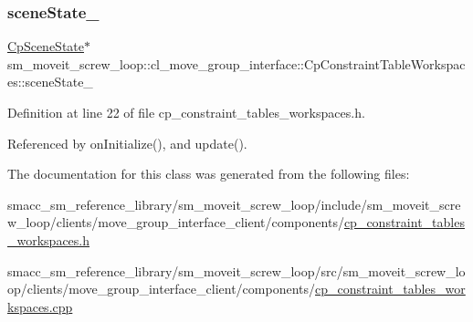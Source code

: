 \subsubsection{\texorpdfstring{scene\+State\+\_\+}{sceneState\_}}
{\footnotesize\ttfamily \hyperlink{classsm__moveit__screw__loop_1_1cl__perception__system_1_1CpSceneState}{Cp\+Scene\+State}$\ast$ sm\+\_\+moveit\+\_\+screw\+\_\+loop\+::cl\+\_\+move\+\_\+group\+\_\+interface\+::\+Cp\+Constraint\+Table\+Workspaces\+::scene\+State\+\_\+\hspace{0.3cm}{\ttfamily [private]}}



Definition at line 22 of file cp\+\_\+constraint\+\_\+tables\+\_\+workspaces.\+h.



Referenced by on\+Initialize(), and update().



The documentation for this class was generated from the following files\+:\begin{DoxyCompactItemize}
\item 
smacc\+\_\+sm\+\_\+reference\+\_\+library/sm\+\_\+moveit\+\_\+screw\+\_\+loop/include/sm\+\_\+moveit\+\_\+screw\+\_\+loop/clients/move\+\_\+group\+\_\+interface\+\_\+client/components/\hyperlink{sm__moveit__screw__loop_2include_2sm__moveit__screw__loop_2clients_2move__group__interface__clie2fece81128f726502672145caddffcf2}{cp\+\_\+constraint\+\_\+tables\+\_\+workspaces.\+h}\item 
smacc\+\_\+sm\+\_\+reference\+\_\+library/sm\+\_\+moveit\+\_\+screw\+\_\+loop/src/sm\+\_\+moveit\+\_\+screw\+\_\+loop/clients/move\+\_\+group\+\_\+interface\+\_\+client/components/\hyperlink{sm__moveit__screw__loop_2src_2sm__moveit__screw__loop_2clients_2move__group__interface__client_2bec6cc346eadf5b695aeac84f198fc7f}{cp\+\_\+constraint\+\_\+tables\+\_\+workspaces.\+cpp}\end{DoxyCompactItemize}
